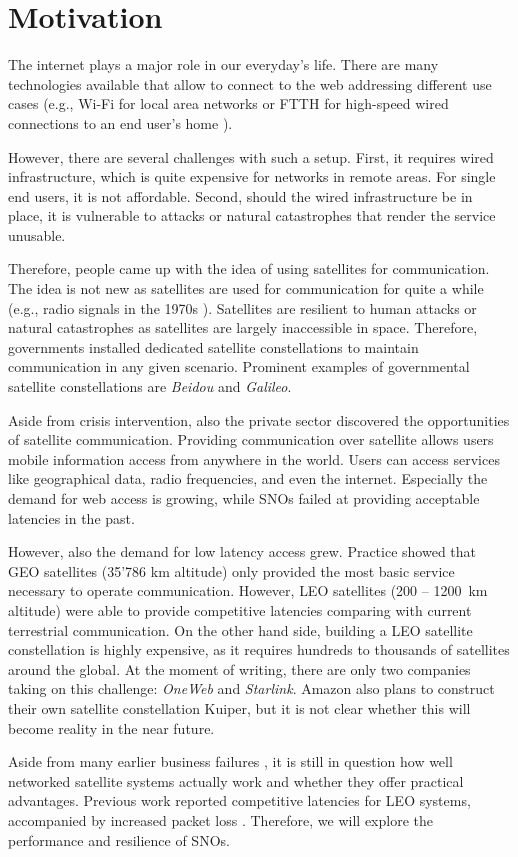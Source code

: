 \section{Motivation} \label{sec:motivation}

The internet plays a major role in our everyday's life. There are many
technologies available that allow to connect to the web addressing different
use cases (e.g., Wi-Fi for local area networks \cite{Henry2002} or \ac{FTTH}
for high-speed wired connections to an end user's home \cite{Aleksic2010}).

However, there are several challenges with such a setup. First, it requires
wired infrastructure, which is quite expensive for networks in remote areas.
For single end users, it is not affordable. Second, should the wired infrastructure be in place, it is vulnerable to attacks or natural catastrophes that render the service unusable.

Therefore, people came up with the idea of using satellites for communication.
The idea is not new as satellites are used for communication for quite a while
(e.g., radio signals in the 1970s \cite{Davies1980}). Satellites are resilient
to human attacks or natural catastrophes as satellites are largely inaccessible
in space. Therefore, governments installed dedicated satellite constellations
to maintain communication in any given scenario. Prominent examples of
governmental satellite constellations are \textit{Beidou} and \textit{Galileo}.

Aside from crisis intervention, also the private sector discovered the
opportunities of satellite communication. Providing communication over
satellite allows users mobile information access from anywhere in the world.
Users can access services like geographical data, radio frequencies, and even
the internet. Especially the demand for web access is growing, while \ac{SNO}s
failed at providing acceptable latencies in the past.

However, also the demand for low latency access grew. Practice showed that
\ac{GEO} satellites (35'786 km altitude) only provided the most basic service
necessary to operate communication. However, \ac{LEO} satellites (200 --
1200~km altitude) were able to provide competitive latencies comparing with
current terrestrial communication. On the other hand side, building a \ac{LEO}
satellite constellation is highly expensive, as it requires hundreds to
thousands of satellites around the global. At the moment of writing, there are
only two companies taking on this challenge: \textit{OneWeb} and
\textit{Starlink}. Amazon also plans to construct their own satellite
constellation Kuiper, but it is not clear whether this will become reality in
the near future.

Aside from many earlier business failures \cite{Chan2002, Barboza2000}, it is
still in question how well networked satellite systems actually work and
whether they offer practical advantages. Previous work reported competitive
latencies for \ac{LEO} systems, accompanied by increased packet loss
\cite{DBLP:conf/imc/MichelTGB22}. Therefore, we will explore the performance
and resilience of \ac{SNO}s.
